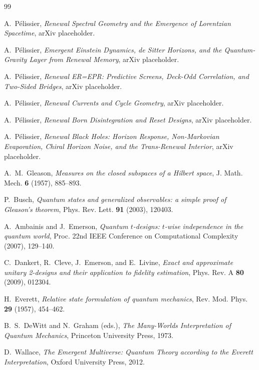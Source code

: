\documentclass[11pt]{article}
\numberwithin{equation}{section}
\theoremstyle{definition}
\theoremstyle{remark}
\begin{document}
\begin{thebibliography}{99}

A.~P\'elissier,
\emph{Renewal Spectral Geometry and the Emergence of Lorentzian Spacetime},
arXiv placeholder.

A.~P\'elissier,
\emph{Emergent Einstein Dynamics, de Sitter Horizons, and the Quantum-Gravity Layer from Renewal Memory},
arXiv placeholder.

A.~P\'elissier,
\emph{Renewal ER=EPR: Predictive Screens, Deck-Odd Correlation, and Two-Sided Bridges},
arXiv placeholder.

A.~P\'elissier,
\emph{Renewal Currents and Cycle Geometry},
arXiv placeholder.

A.~P\'elissier,
\emph{Renewal Born Disintegration and Reset Designs},
arXiv placeholder.

A.~P\'elissier,
\emph{Renewal Black Holes: Horizon Response, Non-Markovian Evaporation, Chiral Horizon Noise, and the Trans-Renewal Interior},
arXiv placeholder.

A.~M.~Gleason,
\emph{Measures on the closed subspaces of a Hilbert space},
J. Math. Mech. \textbf{6} (1957), 885--893.

P.~Busch,
\emph{Quantum states and generalized observables: a simple proof of Gleason's theorem},
Phys. Rev. Lett. \textbf{91} (2003), 120403.

A.~Ambainis and J.~Emerson,
\emph{Quantum \(t\)-designs: \(t\)-wise independence in the quantum world},
Proc. 22nd IEEE Conference on Computational Complexity (2007), 129--140.

C.~Dankert, R.~Cleve, J.~Emerson, and E.~Livine,
\emph{Exact and approximate unitary 2-designs and their application to fidelity estimation},
Phys. Rev. A \textbf{80} (2009), 012304.

H.~Everett,
\emph{Relative state formulation of quantum mechanics},
Rev. Mod. Phys. \textbf{29} (1957), 454--462.

B.~S.~DeWitt and N.~Graham (eds.),
\emph{The Many-Worlds Interpretation of Quantum Mechanics},
Princeton University Press, 1973.

D.~Wallace,
\emph{The Emergent Multiverse: Quantum Theory according to the Everett Interpretation},
Oxford University Press, 2012.


\end{thebibliography}
\end{document}
